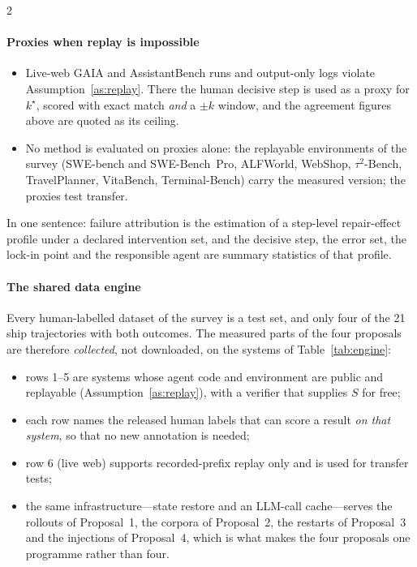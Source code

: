 \begin{multicols}{2}
\paragraph{Proxies when replay is impossible}
\begin{itemize}[leftmargin=1.1em]
\item Live-web GAIA and AssistantBench runs and output-only logs violate Assumption~\ref{as:replay}. There the human decisive step is used as a proxy for $k^\star$, scored with exact match \emph{and} a $\pm k$ window, and the agreement figures above are quoted as its ceiling.
\item No method is evaluated on proxies alone: the replayable environments of the survey (SWE-bench and SWE-Bench~Pro, ALFWorld, WebShop, $\tau^2$-Bench, TravelPlanner, VitaBench, Terminal-Bench) carry the measured version; the proxies test transfer.
\end{itemize}
In one sentence: failure attribution is the estimation of a step-level repair-effect profile under a declared intervention set, and the decisive step, the error set, the lock-in point and the responsible agent are summary statistics of that profile.

\paragraph{The shared data engine} Every human-labelled dataset of the survey is a test set, and only four of the 21 ship trajectories with both outcomes. The measured parts of the four proposals are therefore \emph{collected}, not downloaded, on the systems of Table~\ref{tab:engine}:
\begin{itemize}[leftmargin=1.1em]
\item rows 1--5 are systems whose agent code and environment are public and replayable (Assumption~\ref{as:replay}), with a verifier that supplies $S$ for free;
\item each row names the released human labels that can score a result \emph{on that system}, so that no new annotation is needed;
\item row 6 (live web) supports recorded-prefix replay only and is used for transfer tests;
\item the same infrastructure---state restore and an LLM-call cache---serves the rollouts of Proposal~1, the corpora of Proposal~2, the restarts of Proposal~3 and the injections of Proposal~4, which is what makes the four proposals one programme rather than four.
\end{itemize}
\end{multicols}

